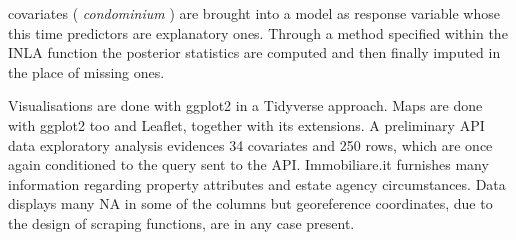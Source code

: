 \documentclass[
  12pt,
  a4paper,
  oneside]{book}
\theoremstyle{definition}
\theoremstyle{definition}
\theoremstyle{definition}
\theoremstyle{remark}
\begin{document}
covariates ( \emph{condominium} ) are brought into a model as response variable whose this time predictors are explanatory ones. Through a method specified within the INLA function the posterior statistics are computed and then finally imputed in the place of missing ones.

Visualisations are done with ggplot2 in a Tidyverse approach. Maps are done with ggplot2 too and Leaflet, together with its extensions.
A preliminary API data exploratory analysis evidences 34 covariates and 250 rows, which are once again conditioned to the query sent to the API. Immobiliare.it furnishes many information regarding property attributes and estate agency circumstances. Data displays many NA in some of the columns but georeference coordinates, due to the design of scraping functions, are in any case present.
\end{document}
